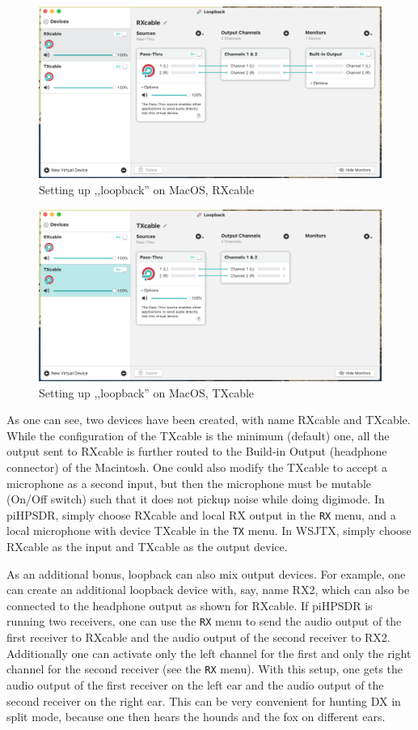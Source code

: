 \documentclass[12pt]{book}
\def\bltt#1{\texttt{\color{blue}#1}}
\begin{document}
\begin{figure}[ht!]
\center
\includegraphics[width=12cm]{loopback_rx.png}
\caption{Setting up ,,loopback'' on MacOS, RXcable}
\label{fig:loopback_rx}
\end{figure}

\begin{figure}[ht!]
\center
\includegraphics[width=12cm]{loopback_tx.png}
\caption{Setting up ,,loopback'' on MacOS, TXcable}
\label{fig:loopback_tx}
\end{figure}

As one can see, two devices have been created, with name RXcable and TXcable.
While the configuration of the TXcable is the minimum (default) one, all the
output sent to RXcable is further routed to the Build-in Output (headphone
connector) of the Macintosh. One could also modify the TXcable to accept a
microphone as a second input, but then the microphone must be mutable
(On/Off switch) such that it does not pickup noise while doing digimode.
In piHPSDR, simply choose RXcable and local RX output in the \bltt{RX} menu,
and a local microphone with device TXcable in the \bltt{TX} menu. In WSJTX,
simply choose RXcable as the input and TXcable as the output device.

As an additional bonus, loopback can also mix output devices. For example, one can create
an additional loopback device with, say, name RX2, which can also be connected to
the headphone output as shown for RXcable. If piHPSDR is running two receivers,
one can use the \bltt{RX} menu to send the audio output of the first receiver to RXcable
and the audio output of the second receiver to RX2. Additionally one can activate only
the left channel for the first and only the right channel for the second receiver
(see the \bltt{RX} menu). With this setup,
one gets the audio output of the first receiver on the left ear and the audio output of
the second receiver on the right ear. This can be very convenient for hunting DX in split mode,
because one then hears the hounds and the fox on different ears.
\end{document}
